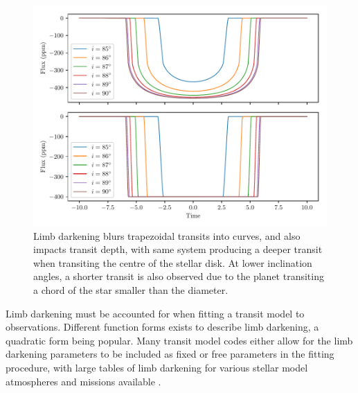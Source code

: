 \begin{figure}[H]
\centering
\includegraphics[width=0.75\columnwidth]{limb_d_model}
\caption{Limb darkening blurs trapezoidal transits into curves, and also impacts transit depth, with same system producing a deeper transit when transiting the centre of the stellar disk. At lower inclination angles, a shorter transit is also observed due to the planet transiting a chord of the star smaller than the diameter.}
\label{fig:limb_model}
\end{figure}
Limb darkening must be accounted for when fitting a transit model to observations. Different function forms exists to describe limb darkening, a quadratic form being popular. Many transit model codes either allow for the limb darkening parameters to be included as fixed or free parameters in the fitting procedure, with large tables of limb darkening for various stellar model atmospheres and missions available \citep{2010Sing,2011Claret}.

